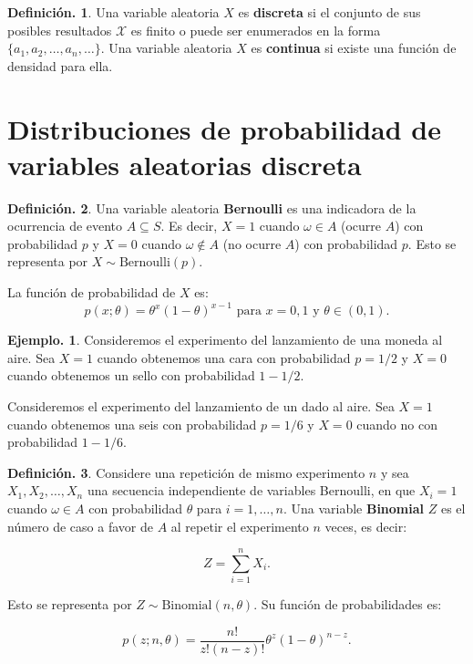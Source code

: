 \documentclass[]{book}
\theoremstyle{definition}
\newtheorem{definition}{Definición.}[chapter]
\theoremstyle{definition}
\newtheorem{example}{Ejemplo.}[chapter]
\theoremstyle{definition}
\theoremstyle{remark}
\begin{document}
\begin{definition}
\protect\hypertarget{def:unnamed-chunk-107}{}{\label{def:unnamed-chunk-107} }
Una variable aleatoria \(X\) es \textbf{discreta} si el conjunto de
sus posibles
resultados \(\mathcal{X}\) es finito o puede ser enumerados en
la forma
\(\{a_1,a_2,\ldots, a_n, \ldots\}\). Una variable aleatoria \(X\)
es \textbf{continua} si existe una función de densidad para ella.
\end{definition}

\hypertarget{distribuciones-de-probabilidad-de-variables-aleatorias-discreta}{%
\section{Distribuciones de probabilidad de variables aleatorias discreta}\label{distribuciones-de-probabilidad-de-variables-aleatorias-discreta}}

\begin{definition}
\protect\hypertarget{def:unnamed-chunk-108}{}{\label{def:unnamed-chunk-108} }
Una variable aleatoria \textbf{Bernoulli} es una indicadora de la
ocurrencia de evento \(A \subseteq S\). Es decir, \(X=1\) cuando
\(\omega \in A\) (ocurre \(A\)) con probabilidad \(p\) y \(X=0\)
cuando \(\omega \notin A\) (no ocurre \(A\)) con probabilidad
\(p\). Esto se representa por \(X \sim \mbox{Bernoulli}(p)\).

La función de probabilidad de \(X\) es:
\[p(x;\theta)= \theta^{x}(1-\theta)^{x-1} \mbox{ para } x=0,1
  \mbox{ y } \theta \in (0,1). \]
\end{definition}

\begin{example}
\protect\hypertarget{exm:unnamed-chunk-109}{}{\label{exm:unnamed-chunk-109} }
Consideremos el experimento del lanzamiento de una moneda al
aire. Sea \(X=1\) cuando obtenemos una cara con
probabilidad \(p=1/2\) y \(X=0\) cuando obtenemos un sello con
probabilidad \(1-1/2\).

Consideremos el experimento del lanzamiento de un dado al
aire. Sea \(X=1\) cuando obtenemos una seis con
probabilidad \(p=1/6\) y \(X=0\) cuando no con
probabilidad \(1-1/6\).
\end{example}

\begin{definition}
\protect\hypertarget{def:unnamed-chunk-110}{}{\label{def:unnamed-chunk-110} }
Considere una repetición de mismo experimento \(n\) y sea
\(X_1, X_2, \ldots,X_n\) una secuencia independiente de
variables Bernoulli, en que \(X_i=1\) cuando \(\omega \in A\) con
probabilidad \(\theta\) para \(i=1, \ldots, n\). Una variable
\textbf{Binomial} \(Z\) es el número de caso a favor de \(A\) al
repetir el experimento \(n\) veces, es decir:

\[ Z = \sum_{i=1}^n X_i . \]

Esto se representa por \(Z \sim \mbox{Binomial}(n,\theta)\). Su
función de probabilidades es:

\[ p(z;n,\theta)=\frac{n!}{z!(n-z)!}\theta^{z}(1-\theta)^{n-
    z}.    \]
\end{definition}
\end{document}
